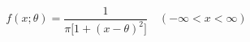 \documentclass[preview]{standalone}
\begin{document}
\begin{align*}
f(x; \theta ) = \dfrac{1}{\pi \bigl[1 + (x -  \theta )^2\bigr]} \quad (-\infty < x < \infty)
\end{align*}
\end{document}
